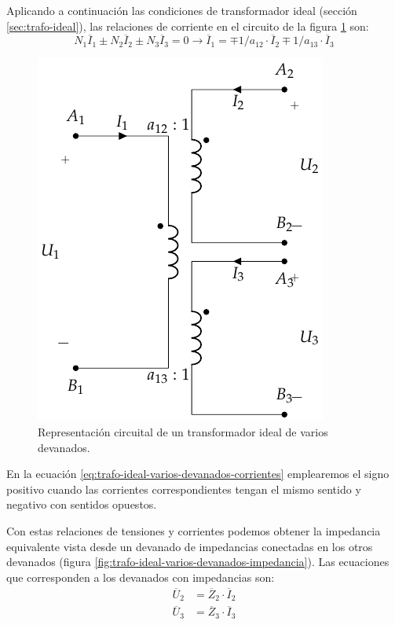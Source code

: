 Aplicando a continuación las condiciones de transformador ideal (sección \ref{sec:trafo-ideal}), las relaciones de corriente en el circuito de la figura \ref{fig:trafo-ideal-varios-devanados} son:
\begin{equation}
  \label{eq:trafo-ideal-varios-devanados-corrientes}
    N_1 \overline{I}_1 \pm N_ 2\overline{I}_2 \pm N_3
    \overline{I}_{3} = 0 \rightarrow
    \overline{I}_1 = \mp 1/a_{12} \cdot \overline{I}_2 \mp
    1/a_{13} \cdot \overline{I}_3
\end{equation}

\begin{figure}
  \centering
  \includegraphics[height=0.25\textheight]{../figs/TrafoIdealVariosDevanados.pdf}
  \caption{Representación circuital de un transformador ideal de varios devanados.}
  \label{fig:trafo-ideal-varios-devanados}
\end{figure}

En la ecuación \ref{eq:trafo-ideal-varios-devanados-corrientes} emplearemos el signo positivo cuando las corrientes correspondientes tengan el mismo sentido y negativo con sentidos opuestos.

Con estas relaciones de tensiones y corrientes podemos obtener la impedancia equivalente vista desde un devanado de impedancias conectadas en los otros devanados (figura \ref{fig:trafo-ideal-varios-devanados-impedancia}). Las ecuaciones que corresponden a los devanados con impedancias son:
\begin{align*}
  \overline{U}_2 &= \overline{Z}_2 \cdot \overline{I}_2\\
  \overline{U}_3 &= \overline{Z}_3 \cdot \overline{I}_3
\end{align*}

